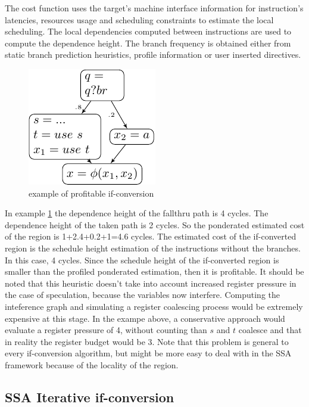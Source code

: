 The cost function uses the target's machine interface information for instruction's latencies, resources usage and scheduling constraints to estimate the local scheduling. The local dependencies computed between instructions are used to compute the dependence height. The branch frequency is obtained either from static branch prediction heuristics, profile information or user inserted directives.
\begin{figure}
    \includegraphics[scale=0.8]{ssa_freq}
\caption{example of profitable if-conversion}
\label{fig:ssa_freq}
\end{figure}

In example \ref{fig:ssa_freq} the dependence height of the fallthru path is 4 cycles. The dependence height of the taken path is 2 cycles. So the ponderated estimated cost of the region is 1+2.4+0.2+1=4.6 cycles. The estimated cost of the if-converted region is the schedule height estimation of the instructions without the branches. In this case, 4 cycles. Since the schedule height of the if-converted region is smaller than the profiled ponderated estimation, then it is profitable.
It should be noted that this heuristic doesn't take into account increased register pressure in the case of speculation, because the variables now interfere. Computing the inteference graph and simulating a register coalescing process would be extremely expensive at this stage. In the exampe above, a conservative approach would evaluate a register pressure of 4, without counting than $s$ and $t$ coalesce and that in reality the register budget would be 3. Note that this problem is general to every if-conversion algorithm, but might be more easy to deal with in the SSA framework because of the locality of the region.

\subsection{SSA Iterative if-conversion}

